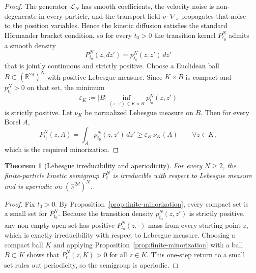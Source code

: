\documentclass[11pt]{article}
\newtheorem{theorem}{Theorem}[section]
\theoremstyle{definition}
\theoremstyle{remark}
\newcommand{\R}{\mathbb{R}}
\begin{document}
\begin{proof}
The generator \(\mathcal L_N\) has smooth coefficients, the velocity noise is
non-degenerate in every particle, and the transport field \(v\cdot\nabla_x\)
propagates that noise to the position variables. Hence the kinetic diffusion
satisfies the standard H\"ormander bracket condition, so for every \(t_0>0\) the
transition kernel \(P_{t_0}^N\) admits a smooth density
\[
P_{t_0}^N(z,dz')=p_{t_0}^N(z,z')\,dz'
\]
that is jointly continuous and strictly positive.
Choose a Euclidean ball \(B\subset(\R^{2d})^N\) with positive Lebesgue measure.
Since \(K\times B\) is compact and \(p_{t_0}^N>0\) on that set, the minimum
\[
\varepsilon_K:=|B|\inf_{(z,z')\in K\times B} p_{t_0}^N(z,z')
\]
is strictly positive. Let \(\nu_K\) be normalized Lebesgue measure on \(B\).
Then for every Borel \(A\),
\[
P_{t_0}^N(z,A)
=
\int_A p_{t_0}^N(z,z')\,dz'
\geq
\varepsilon_K\,\nu_K(A)
\qquad
\forall z\in K,
\]
which is the required minorization.
\end{proof}

\begin{theorem}[Lebesgue irreducibility and aperiodicity]\label{thm:finite-irreducible}
For every \(N\geq2\), the finite-particle kinetic semigroup \(P_t^N\) is
irreducible with respect to Lebesgue measure and is aperiodic on
\((\R^{2d})^N\).
\end{theorem}

\begin{proof}
Fix \(t_0>0\). By Proposition~\ref{prop:finite-minorization}, every compact set
is a small set for \(P_{t_0}^N\). Because the transition density
\(p_{t_0}^N(z,z')\) is strictly positive, any non-empty open set has positive
\(P_{t_0}^N(z,\cdot)\)-mass from every starting point \(z\), which is exactly
irreducibility with respect to Lebesgue measure. Choosing a compact ball \(K\) and applying
Proposition~\ref{prop:finite-minorization} with a ball \(B\subset K\) shows that
\(P_{t_0}^N(z,K)>0\) for all \(z\in K\). This one-step return to a small set
rules out periodicity, so the semigroup is aperiodic.
\end{proof}
\end{document}
